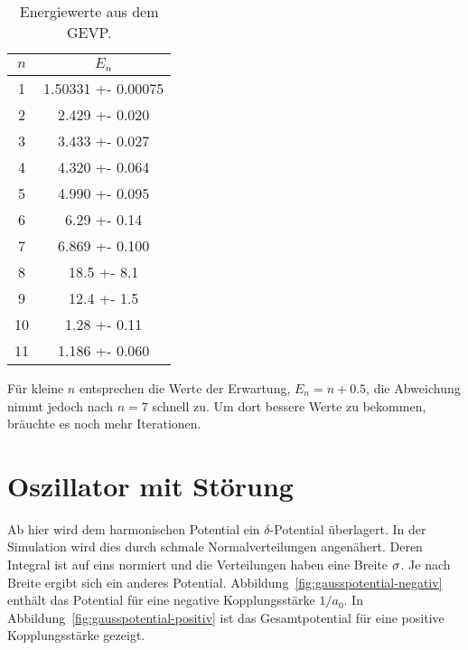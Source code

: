 \begin{table}
    \centering
    \begin{tabular}{SS}
        {$n$} & {$E_n$} \\
         & 1.50331 +- 0.00075 \\
         2 &   2.429 +- 0.020   \\
         3 &   3.433 +- 0.027   \\
         4 &   4.320 +- 0.064   \\
         5 &   4.990 +- 0.095   \\
         6 &    6.29 +- 0.14    \\
         7 &   6.869 +- 0.100   \\
         8 &    18.5 +- 8.1     \\
         9 &    12.4 +- 1.5     \\
        10 &    1.28 +- 0.11    \\
        11 &   1.186 +- 0.060  
    \end{tabular}
    \caption{%
        Energiewerte aus dem GEVP.
    }
    \label{tab:ED7AA2-eigenwerte}
\end{table}

Für kleine $n$ entsprechen die Werte der Erwartung, $E_n = n + \num{0.5}$, die
Abweichung nimmt jedoch nach $n = 7$ schnell zu. Um dort bessere Werte zu
bekommen, bräuchte es noch mehr Iterationen.

\FloatBarrier
\section{Oszillator mit Störung}

Ab hier wird dem harmonischen Potential ein $\delta$-Potential überlagert. In
der Simulation wird dies durch schmale Normalverteilungen angenähert. Deren
Integral ist auf eins normiert und die Verteilungen haben eine Breite
$\sigma$. Je nach Breite ergibt sich ein anderes Potential.
Abbildung~\ref{fig:gausspotential-negativ} enthält das Potential für eine
negative Kopplungsstärke $1/a_0$. In Abbildung~\ref{fig:gausspotential-positiv}
ist das Gesamtpotential für eine positive Kopplungsstärke gezeigt.

